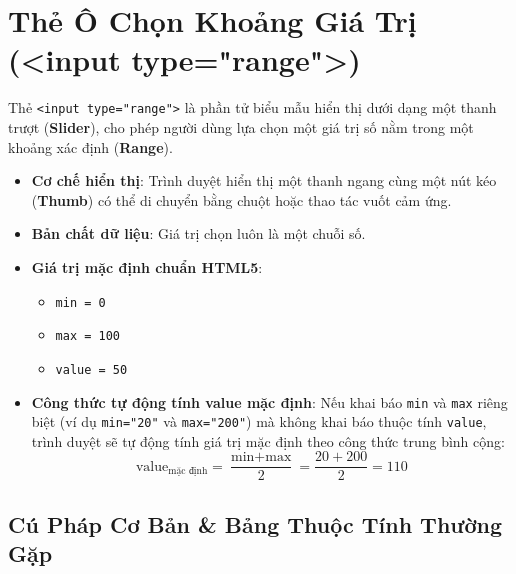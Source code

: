 \documentclass[11pt,oneside]{book}
\newcommand{\codeinline}[1]{\textcolor{accentOrange}{\texttt{#1}}}
\newcommand{\term}[1]{\textbf{\textcolor{primaryBlue}{#1}}}
\begin{document}
\section[Thẻ Ô Chọn Khoảng Giá Trị]{Thẻ Ô Chọn Khoảng Giá Trị (<input type="range">)}
\label{sec:html_range}

\begin{conceptBox}
Thẻ \codeinline{<input type="range">} là phần tử biểu mẫu hiển thị dưới dạng một thanh trượt (\term{Slider}), cho phép người dùng lựa chọn một giá trị số nằm trong một khoảng xác định (\term{Range}).
\begin{itemize}[leftmargin=1.5em, itemsep=2pt, parsep=0pt]
    \item \textbf{Cơ chế hiển thị}: Trình duyệt hiển thị một thanh ngang cùng một nút kéo (\term{Thumb}) có thể di chuyển bằng chuột hoặc thao tác vuốt cảm ứng.
    \item \textbf{Bản chất dữ liệu}: Giá trị chọn luôn là một chuỗi số.
    \item \textbf{Giá trị mặc định chuẩn HTML5}:
      \begin{itemize}
        \item \codeinline{min = 0}
        \item \codeinline{max = 100}
        \item \codeinline{value = 50}
      \end{itemize}
    \item \textbf{Công thức tự động tính value mặc định}: Nếu khai báo \codeinline{min} và \codeinline{max} riêng biệt (ví dụ \codeinline{min="20"} và \codeinline{max="200"}) mà không khai báo thuộc tính \codeinline{value}, trình duyệt sẽ tự động tính giá trị mặc định theo công thức trung bình cộng:
    \[
    \text{value}_{\text{mặc định}} = \frac{\text{min} + \text{max}}{2} = \frac{20 + 200}{2} = 110
    \]
\end{itemize}
\end{conceptBox}

\subsection{Cú Pháp Cơ Bản \& Bảng Thuộc Tính Thường Gặp}
\end{document}

